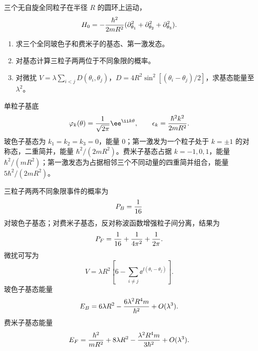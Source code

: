 \begin{question}
三个无自旋全同粒子在半径 $R$ 的圆环上运动，
\[
  H_0=-{\hbar^2\over2mR^2}(\partial_{\theta_1}^2+\partial_{\theta_2}^2+\partial_{\theta_3}^2).
\]
\begin{enumerate}
  \item 求三个全同玻色子和费米子的基态、第一激发态。
  \item 对基态计算三粒子两两位于不同象限的概率。
  \item 对微扰 $V=\lambda\sum_{i<j}D(\theta_i,\theta_j)$，$D=4R^2\sin^2[(\theta_i-\theta_j)/2]$，求基态能量至 $\lambda^2$。
\end{enumerate}
\begin{solution}
单粒子基底
\[
  \varphi_k(\theta)={1\over\sqrt{2\pi}}\ee^{\ii k\theta},\qquad
  \epsilon_k={\hbar^2k^2\over2mR^2}.
\]
玻色子基态为 $k_1=k_2=k_3=0$，能量 $0$；第一激发为一个粒子处于 $k=\pm1$ 的对称态，二重简并，能量 $\hbar^2/(2mR^2)$。费米子基态占据 $k=-1,0,1$，能量 $\hbar^2/(mR^2)$；第一激发态为占据相邻三个不同动量的四重简并组合，能量 $5\hbar^2/(2mR^2)$。

三粒子两两不同象限事件的概率为
\[
  P_B={1\over16}
\]
对玻色子基态；对费米子基态，反对称波函数增强粒子间分离，结果为
\[
  P_F={1\over16}+{1\over4\pi^2}+{1\over2\pi}.
\]
微扰可写为
\[
  V=\lambda R^2\left[6-\sum_{i\ne j}\ee^{\ii(\theta_i-\theta_j)}\right].
\]
玻色子基态能量
\[
  E_B=6\lambda R^2-{6\lambda^2R^4m\over\hbar^2}+O(\lambda^3).
\]
费米子基态能量
\[
  E_F={\hbar^2\over mR^2}+8\lambda R^2-{\lambda^2R^4m\over3\hbar^2}+O(\lambda^3).
\]
\end{solution}
\end{question}

